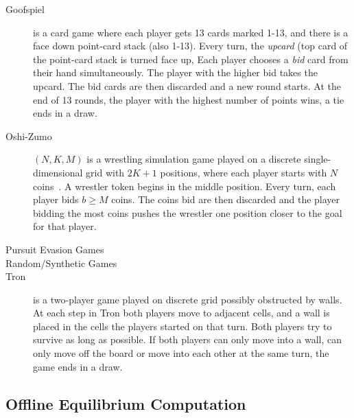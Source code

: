 \begin{description}
\item[Goofspiel] is a card game where each player gets 13 cards marked 1-13, and there is a face down
point-card stack (also 1-13). Every turn, the {\it upcard} (top card of the point-card stack is turned face up,
Each player chooses a {\it bid} card from their hand simultaneously.
The player with the higher bid takes the upcard. The bid cards are then discarded and a new round starts.
At the end of 13 rounds, the player with the highest number of points wins, a tie ends in a draw.

\item[Oshi-Zumo]$(N,K,M)$ is a wrestling simulation game played on a discrete single-dimensional grid with
$2K+1$ positions, where each player starts with $N$ coins~\cite{buro2003}. A wrestler token begins in the middle
position. Every turn,
each player bids $b \ge M$ coins. The coins bid are then discarded and the player bidding the most coins pushes the
wrestler one position closer to the goal for that player. 

\item[Pursuit Evasion Games]

\item[Random/Synthetic Games]

\item[Tron] is a two-player game played on discrete grid possibly obstructed by walls. At each
step in Tron both players move to adjacent cells, and a wall is placed in the cells the players started on that turn.
Both players try to survive as long as possible. If both players can only move into a wall, can only move off the board or move into each other at the same turn, the game ends  in a draw. 
\end{description}

\subsection{Offline Equilibrium Computation}

